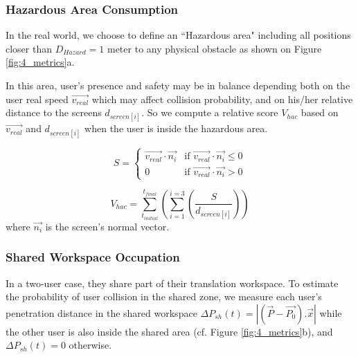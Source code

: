 \subsubsection{Hazardous Area Consumption}
In the real world, we choose to define an ``Hazardous area" including all positions closer than $D_{Hazard}=1$ meter to any physical obstacle as shown on Figure \ref{fig:4_metrics}a.

In this area, user's presence and safety may be in balance depending both on the user real speed $\overrightarrow{v_{real}}$ which may affect collision probability, and on his/her relative distance to the screens $d_{screen[i]}$. So we compute a relative score $V_{hac}$ based on $\overrightarrow{v_{real}}$ and $d_{screen[i]}$ when the user is inside the hazardous area. 

\begin{equation}
S = 
  \begin{cases}
  \overrightarrow{v_{real}}\cdot\overrightarrow{n_{i}} & \text{if } \overrightarrow{v_{real}}\cdot\overrightarrow{n_{i}} \leq 0 \\
  0 & \text{if } \overrightarrow{v_{real}}\cdot\overrightarrow{n_{i}} > 0
  \end{cases}
\end{equation}

\begin{equation}
V_{hac}=\sum_{t_{initial}}^{t_{final}}\left(\sum_{i=1}^{i=3}\left(\frac{S}{d_{screen[i]}}\right)\right)
\end{equation}
where $\overrightarrow{n_{i}}$ is the screen's normal vector.


\subsubsection{Shared Workspace Occupation}
In a two-user case, they share part of their translation workspace. To estimate the probability of user collision in the shared zone, we measure each user's penetration distance in the shared workspace $\Delta P_{sh}(t)=\left|(\overrightarrow{P}-\overrightarrow{P_{0}}).\overrightarrow{x}\right|$ while the other user is also inside the shared area (cf. Figure \ref{fig:4_metrics}b), and $\Delta P_{sh}(t)=0$ otherwise.

